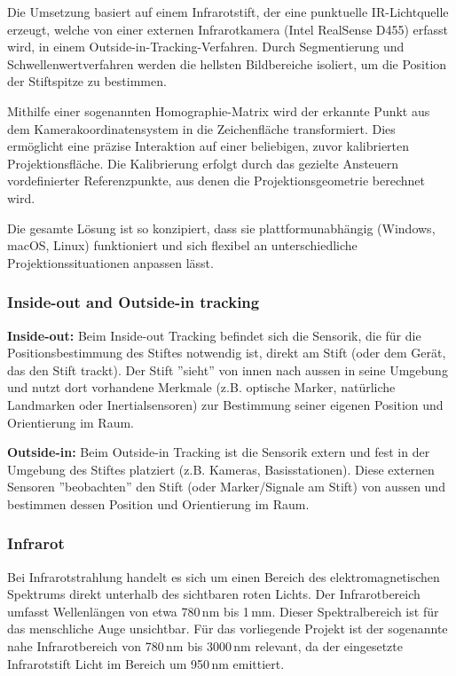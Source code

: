 Die Umsetzung basiert auf einem Infrarotstift, der eine punktuelle IR-Lichtquelle erzeugt, welche von einer externen Infrarotkamera (Intel RealSense D455) erfasst wird, in einem Outside-in-Tracking-Verfahren. Durch Segmentierung und Schwellenwertverfahren werden die hellsten Bildbereiche isoliert, um die Position der Stiftspitze zu bestimmen.

Mithilfe einer sogenannten Homographie-Matrix wird der erkannte Punkt aus dem Kamerakoordinatensystem in die Zeichenfläche transformiert. Dies ermöglicht eine präzise Interaktion auf einer beliebigen, zuvor kalibrierten Projektionsfläche. Die Kalibrierung erfolgt durch das gezielte Ansteuern vordefinierter Referenzpunkte, aus denen die Projektionsgeometrie berechnet wird.

Die gesamte Lösung ist so konzipiert, dass sie plattformunabhängig (Windows, macOS, Linux) funktioniert und sich flexibel an unterschiedliche Projektionssituationen anpassen lässt.

\subsubsection{Inside-out and Outside-in tracking}

\textbf{Inside-out:}
Beim Inside-out Tracking befindet sich die Sensorik, die für die Positionsbestimmung des Stiftes notwendig ist, direkt am Stift (oder dem Gerät, das den Stift trackt). Der Stift ''sieht'' von innen nach aussen in seine Umgebung und nutzt dort vorhandene Merkmale (z.B. optische Marker, natürliche Landmarken oder Inertialsensoren) zur Bestimmung seiner eigenen Position und Orientierung im Raum.\\
\cite{tracking_source}

\textbf{Outside-in:}
Beim Outside-in Tracking ist die Sensorik extern und fest in der Umgebung des Stiftes platziert (z.B. Kameras, Basisstationen). Diese externen Sensoren ''beobachten'' den Stift (oder Marker/Signale am Stift) von aussen und bestimmen dessen Position und Orientierung im Raum.\\
\cite{tracking_source}
\subsubsection{Infrarot}

Bei Infrarotstrahlung handelt es sich um einen Bereich des elektromagnetischen Spektrums direkt unterhalb des sichtbaren roten Lichts. Der Infrarotbereich umfasst Wellenlängen von etwa 780\,nm bis 1\,mm. Dieser Spektralbereich ist für das menschliche Auge unsichtbar. Für das vorliegende Projekt ist der sogenannte nahe Infrarotbereich von 780\,nm bis 3000\,nm relevant, da der eingesetzte Infrarotstift Licht im Bereich um 950\,nm emittiert.\\
\cite{optik_eugene_hecht}


